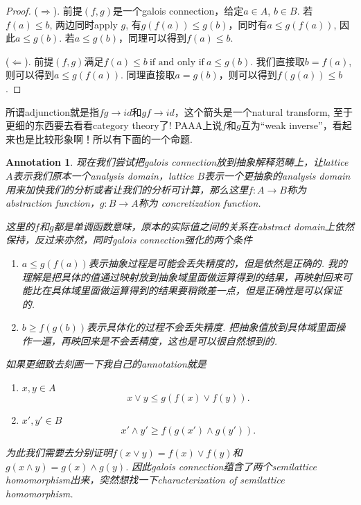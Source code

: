 \documentclass{article}
\newtheorem{annotation}[theorem]{Annotation}
\newcommand*{\xfunc}[4]{{#2}\colon{#3}{#1}{#4}}
\newcommand*{\func}[3]{\xfunc{\to}{#1}{#2}{#3}}
\begin{document}
\begin{center}
\end{center}

\begin{proof}
($\Rightarrow$). 前提$(f,g)$是一个galois connection，给定$a \in A$, $b \in B$. 若$f(a) \leq b$, 两边同时apply $g$, 有$g(f(a)) \leq g(b)$，同时有$a \leq g(f(a))$, 因此$a \leq g(b)$. 若$a \leq g(b)$，同理可以得到$f(a) \leq b$.

($\Leftarrow$). 前提$(f,g)$满足$f(a) \leq b~\text{if and only if}~a \leq g(b)$. 我们直接取$b = f(a)$, 则可以得到$a \leq g(f(a))$. 同理直接取$a = g(b)$，则可以得到$f(g(a)) \leq b$.   
\end{proof}

{\color{blue} 所谓adjunction就是指$fg \rightarrow id$和$gf \rightarrow id$，这个箭头是一个natural transform, 至于更细的东西要去看看category theory了! PAAA上说$f$和$g$互为“weak inverse”，看起来也是比较形象啊！所以有下面的一个命题}.

\begin{annotation}
\rm 现在我们尝试把galois connection放到抽象解释范畴上，让lattice $A$表示我们原本一个analysis domain，lattice $B$表示一个更抽象的analysis domain用来加快我们的分析或者让我们的分析可计算，那么这里$\func{f}{A}{B}$称为{\color{red} abstraction function}，$\func{g}{B}{A}$称为{\color{red} concretization function}. 

这里的$f$和$g$都是单调函数意味，原本的实际值之间的关系在abstract domain上依然保持，反过来亦然，同时galois connection强化的两个条件
\begin{enumerate}
	\item $a \leq g(f(a))$表示抽象过程是可能会丢失精度的，但是依然是正确的. {\color{blue} 我的理解是把具体的值通过映射放到抽象域里面做运算得到的结果，再映射回来可能比在具体域里面做运算得到的结果要稍微差一点，但是正确性是可以保证的}.
	\item $b \geq f(g(b))$表示具体化的过程不会丢失精度. {\color{blue} 把抽象值放到具体域里面操作一遍，再映回来是不会丢精度，这也是可以很自然想到的}.
\end{enumerate}
如果更细致去刻画一下我自己的annotation就是
\begin{enumerate}
	\item $x,y \in A$
	$$
	x \vee y \leq g(f(x) \vee f(y)).
	$$
	\item $x',y'\in B$
	$$
	x' \wedge y' \geq f(g(x') \wedge g(y')).
	$$
\end{enumerate}
为此我们需要去分别证明$f(x \vee y) = f(x) \vee f(y)$和$g(x \wedge y) = g(x) \wedge g(y)$. 因此galois connection蕴含了两个semilattice homomorphism出来，突然想找一下characterization of semilattice homomorphism.
\end{annotation}
\end{document}
